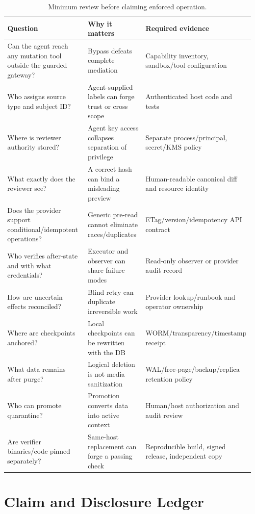 \begin{table}[h]
\centering
\caption{Minimum review before claiming enforced operation.}
\scriptsize
\begin{tabularx}{0.98\textwidth}{@{}p{44mm}Yp{42mm}@{}}
\toprule
Question & Why it matters & Required evidence \\
\midrule
Can the agent reach any mutation tool outside the guarded gateway? & Bypass defeats complete mediation & Capability inventory, sandbox/tool configuration \\
Who assigns source type and subject ID? & Agent-supplied labels can forge trust or cross scope & Authenticated host code and tests \\
Where is reviewer authority stored? & Agent key access collapses separation of privilege & Separate process/principal, secret/KMS policy \\
What exactly does the reviewer see? & A correct hash can bind a misleading preview & Human-readable canonical diff and resource identity \\
Does the provider support conditional/idempotent operations? & Generic pre-read cannot eliminate races/duplicates & ETag/version/idempotency API contract \\
Who verifies after-state and with what credentials? & Executor and observer can share failure modes & Read-only observer or provider audit record \\
How are uncertain effects reconciled? & Blind retry can duplicate irreversible work & Provider lookup/runbook and operator ownership \\
Where are checkpoints anchored? & Local checkpoints can be rewritten with the DB & WORM/transparency/timestamp receipt \\
What data remains after purge? & Logical deletion is not media sanitization & WAL/free-page/backup/replica retention policy \\
Who can promote quarantine? & Promotion converts data into active context & Human/host authorization and audit review \\
Are verifier binaries/code pinned separately? & Same-host replacement can forge a passing check & Reproducible build, signed release, independent copy \\
\bottomrule
\end{tabularx}
\end{table}

\section{Claim and Disclosure Ledger}

